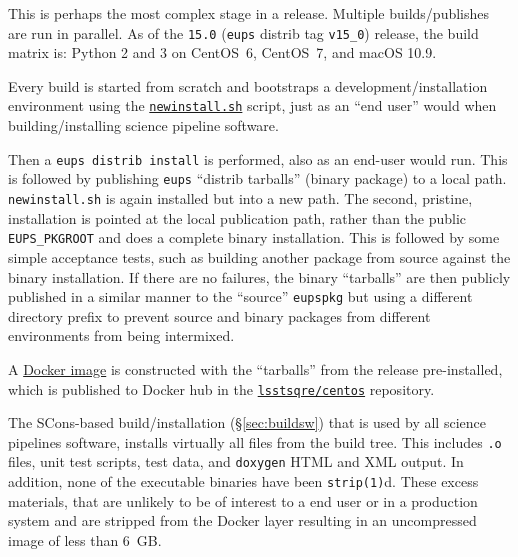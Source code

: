 This is perhaps the most complex stage in a release.  Multiple builds/publishes
are run in parallel.  As of the \texttt{15.0} (\texttt{eups} distrib tag
\texttt{v15\_0}) release, the build matrix is: Python 2 and 3 on CentOS~6, CentOS~7, and macOS 10.9.

\noindent Every build is started from scratch and bootstraps a development/installation environment using the \href{https://github.com/lsst/lsst/blob/master/scripts/newinstall.sh}{\texttt{new\-install.sh}}\cite{pipelines-guide} script, just as an ``end user'' would when building/installing science pipeline software.

\noindent Then a \texttt{eups distrib install} is performed, also as an end-user would
run.  This is followed by publishing \texttt{eups} ``distrib tarballs'' (binary
package) to a local path.  \texttt{newinstall.sh} is again installed but into a
new path.  The second, pristine, installation is pointed at the local publication
path, rather than the public \texttt{EUPS\_PKGROOT} and does a complete binary
installation.  This is followed by some simple acceptance tests, such as
building another package from source against the binary installation.  If there
are no failures, the binary ``tarballs'' are then publicly published in a
similar manner to the ``source'' \texttt{eupspkg} but using a different
directory prefix to prevent source and binary packages from different
environments from being intermixed.

A \href{https://github.com/lsst-sqre/docker-tarballs}{Docker image} is
constructed with the ``tarballs'' from the release pre-installed, which is
published to Docker hub in the
\href{https://hub.docker.com/r/lsstsqre/centos/}{\texttt{lsstsqre/centos}} repository.

\noindent The SCons-based build/installation (\S\ref{sec:buildsw}) that is used by all science pipelines software, installs
virtually all files from the build tree. This includes \texttt{.o} files, unit
test scripts, test data, and \texttt{doxygen} HTML and XML output. In
addition, none of the executable binaries have been \texttt{strip(1)}d.  These
excess materials, that are unlikely to be of interest to a end user or in a
production system
and are stripped from the Docker layer resulting in an uncompressed image of less than 6~GB.

